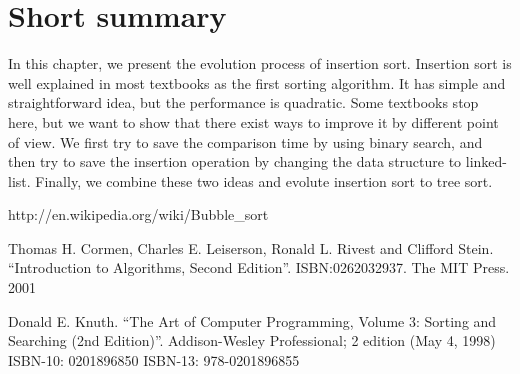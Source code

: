 \documentclass[UTF8]{article}
\begin{document}
\section{Short summary}
In this chapter, we present the evolution process of insertion sort. Insertion
sort is well explained in most textbooks as the first sorting algorithm.
It has simple and straightforward idea, but the performance is quadratic.
Some textbooks stop here, but we want to show that there exist ways to improve
it by different point of view. We first try to save the comparison time
by using binary search, and then try to save the insertion operation by
changing the data structure to linked-list. Finally, we combine these
two ideas and evolute insertion sort to tree sort.

\begin{thebibliography}{99}

http://en.wikipedia.org/wiki/Bubble\_sort

Thomas H. Cormen, Charles E. Leiserson, Ronald L. Rivest and Clifford Stein.
``Introduction to Algorithms, Second Edition''. ISBN:0262032937. The MIT Press. 2001

Donald E. Knuth. ``The Art of Computer Programming, Volume 3: Sorting and Searching (2nd Edition)''. Addison-Wesley Professional; 2 edition (May 4, 1998) ISBN-10: 0201896850 ISBN-13: 978-0201896855

\end{thebibliography}

\ifx\wholebook\relax\else
\end{document}
